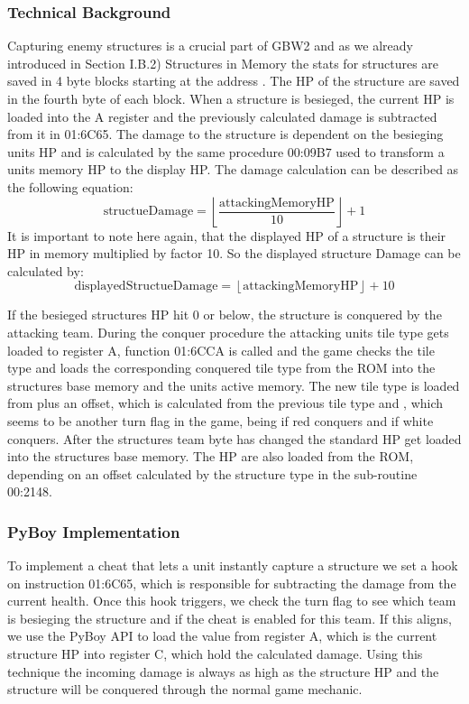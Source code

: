 \subsubsection{Technical Background}
Capturing enemy structures is a crucial part of GBW2 and as we already introduced in Section I.B.2) Structures in Memory the stats for structures are saved in 4 byte blocks starting at the address .
The HP of the structure are saved in the fourth byte of each block. When a structure is besieged, the current HP is loaded into the A register and the previously calculated damage is subtracted from it in 01:6C65.
The damage to the structure is dependent on the besieging units HP and is calculated by the same procedure 00:09B7 used to transform a units memory HP to the display HP.
The damage calculation can be described as the following equation:
\begin{equation}
	\text{structueDamage} = \left\lfloor \frac{\text{attackingMemoryHP}}{10} \right\rfloor + 1
\end{equation}
It is important to note here again, that the displayed HP of a structure is their HP in memory multiplied by factor 10.
So the displayed structure Damage can be calculated by:
\begin{equation}
	\text{displayedStructueDamage} = \left\lfloor \text{attackingMemoryHP} \right\rfloor + 10
\end{equation}

If the besieged structures HP hit 0 or below, the structure is conquered by the attacking team.
During the conquer procedure the attacking units tile type gets loaded to register A, function 01:6CCA is called and the game checks the tile type and loads the corresponding conquered tile type from the ROM into the structures base memory and the units active memory.
The new tile type is loaded from  plus an offset, which is calculated from the previous tile type and , which seems to be another turn flag in the game, being  if red conquers and  if white conquers.
After the structures team byte has changed the standard HP get loaded into the structures base memory. The HP are also loaded from the ROM, depending on an offset calculated by the structure type in the sub-routine 00:2148.
\subsubsection{PyBoy Implementation}
To implement a cheat that lets a unit instantly capture a structure we set a hook on instruction 01:6C65, which is responsible for subtracting the damage from the current health.
Once this hook triggers, we check the turn flag to see which team is besieging the structure and if the cheat is enabled for this team.
If this aligns, we use the PyBoy API to load the value from register A, which is the current structure HP into register C, which hold the calculated damage.
Using this technique the incoming damage is always as high as the structure HP and the structure will be conquered through the normal game mechanic.